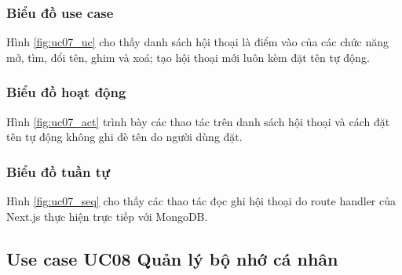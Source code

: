 \documentclass[../DoAn.tex]{subfiles}
\begin{document}
\subsubsection{Biểu đồ use case}
Hình \ref{fig:uc07_uc} cho thấy danh sách hội thoại là điểm vào của các chức năng mở, tìm, đổi tên, ghim và xoá; tạo hội thoại mới luôn kèm đặt tên tự động.


\subsubsection{Biểu đồ hoạt động}
Hình \ref{fig:uc07_act} trình bày các thao tác trên danh sách hội thoại và cách đặt tên tự động không ghi đè tên do người dùng đặt.


\subsubsection{Biểu đồ tuần tự}
Hình \ref{fig:uc07_seq} cho thấy các thao tác đọc ghi hội thoại do route handler của Next.js thực hiện trực tiếp với MongoDB.



\subsection{Use case UC08 Quản lý bộ nhớ cá nhân}
\label{subsection:uc08}
\end{document}
